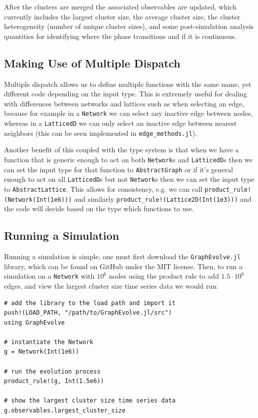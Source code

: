 After the clusters are merged the associated observables are updated, which currently includes the largest cluster size, the average cluster size, the cluster heterogeneity (number of unique cluster sizes), and some post-simulation analysis quantities for identifying where the phase transitions and if it is continuous.

\subsection{Making Use of Multiple Dispatch}
Multiple dispatch allows us to define multiple functions with the same name, yet different code depending on the input type.
This is extremely useful for dealing with differences between networks and lattices such as when selecting an edge, because for example in a \texttt{Network} we can select any inactive edge between nodes, whereas in a \texttt{LatticedD} we can only select an inactive edge between nearest neighbors (this can be seen implemented in \texttt{edge\_methods.jl}).

Another benefit of this coupled with the type system is that when we have a function that is generic enough to act on both \texttt{Network}s and \texttt{LatticedD}s then we can set the input type for that function to \texttt{AbstractGraph} or if it's general enough to act on all \texttt{LatticedD}s but not \texttt{Network}s then we can set the input type to \texttt{AbstractLattice}.
This allows for consistency, e.g. we can call \texttt{product\_rule!(Network(Int(1e6)))} and similarly \texttt{product\_rule!(Lattice2D(Int(1e3)))} and the code will decide based on the type which functions to use.

\subsection{Running a Simulation}
Running a simulation is simple, one must first download the \texttt{GraphEvolve.jl} library, which can be found on GitHub under the MIT license.
Then, to run a simulation on a \texttt{Network} with $10^6$ nodes using the product rule to add $1.5 \cdot 10^6$ edges, and view the largest cluster size time series data we would run:

\begin{lstlisting}
# add the library to the load path and import it
push!(LOAD_PATH, "/path/to/GraphEvolve.jl/src")
using GraphEvolve

# instantiate the Network
g = Network(Int(1e6))

# run the evolution process
product_rule!(g, Int(1.5e6))

# show the largest cluster size time series data
g.observables.largest_cluster_size
\end{lstlisting}
